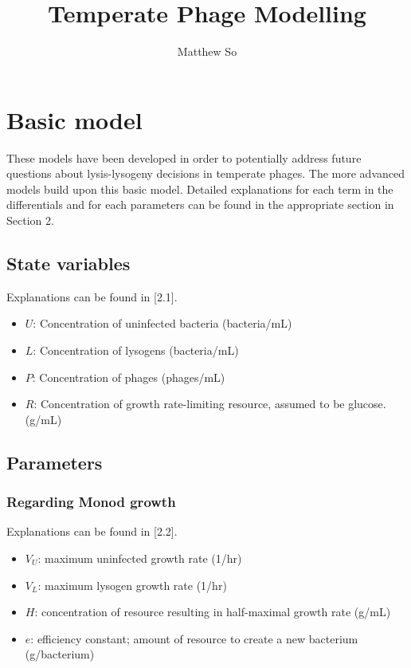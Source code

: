 \documentclass{article}
\begin{document}
\title{Temperate Phage Modelling}
\author{Matthew So}
\maketitle

\section{Basic model}
These models have been developed in order to potentially address future questions about lysis-lysogeny decisions in temperate phages.
The more advanced models build upon this basic model. Detailed explanations for each term in the differentials and for each parameters can be found in the appropriate section in Section 2.

\subsection{State variables}
Explanations can be found in [2.1].
\begin{itemize}
\item $U$: Concentration of uninfected bacteria (bacteria/mL) 
\item $L$: Concentration of lysogens (bacteria/mL)
\item $P$: Concentration of phages (phages/mL)
\item $R$: Concentration of growth rate-limiting resource, assumed to be glucose.  (g/mL)
\end{itemize}

\subsection{Parameters}
\subsubsection{Regarding Monod growth} 
Explanations can be found in [2.2].
\begin{itemize}
\item $V_U$: maximum uninfected growth rate (1/hr)

\item $V_L$: maximum lysogen growth rate (1/hr)

\item $H$: concentration of resource resulting in half-maximal growth rate  (g/mL)

\item $e$: efficiency constant; amount of resource to create a new bacterium (g/bacterium)
\end{itemize}
\end{document}
